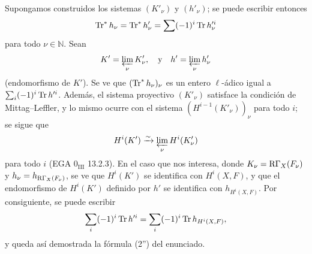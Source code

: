 Supongamos construidos los sistemas $(K'_\nu)$ y $(h'_\nu)$; se puede escribir entonces
\[
\operatorname{Tr}^*h_\nu=\operatorname{Tr}^*h'_\nu=\sum(-1)^i\operatorname{Tr} h_\nu'^i
\]
para todo $\nu\in\mathbb N$. Sean
\[
K'=\varprojlim_\nu K'_\nu,
\quad\text{y}\quad h'=\varprojlim_\nu h'_\nu
\]
(endomorfismo de $K'$). Se ve que $(\operatorname{Tr}^*h_\nu)_\nu$ es un entero $\ell$-ádico igual a $\sum_i(-1)^i\operatorname{Tr} h'^i$. Además, el sistema proyectivo $(K'_\nu)$ satisface la condición de Mittag--Leffler, y lo mismo ocurre con el sistema $(H^{i-1}(K'_\nu))_\nu$ para todo $i$; se sigue que
\[
H^i(K')\xrightarrow{\sim}\varprojlim_\nu H^i(K'_\nu)
\]
para todo $i$ (EGA $0_{\mathrm{III}}$ 13.2.3). En el caso que nos interesa, donde $K_\nu=\mathrm{R}\Gamma_X(F_\nu)$ y $h_\nu=h_{\mathrm{R}\Gamma_X(F_\nu)}$, se ve que $H^i(K')$ se identifica con $H^i(X,F)$, y que el endomorfismo de $H^i(K')$ definido por $h'$ se identifica con $h_{H^i(X,F)}$. Por consiguiente, se puede escribir
\[
\sum_i(-1)^i\operatorname{Tr} h'^i=
\sum_i(-1)^i\operatorname{Tr} h_{H^i(X,F)},
\]
y queda así demostrada la fórmula (2'') del enunciado.
